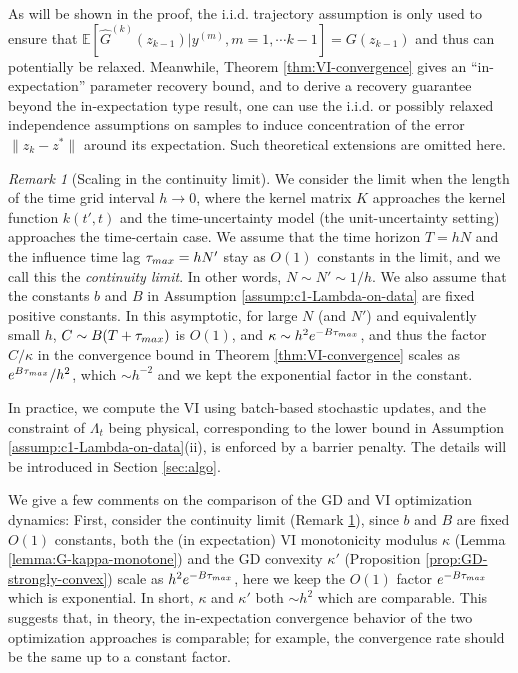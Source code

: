 \documentclass[11pt]{article}
\theoremstyle{remark}
\newtheorem{remark}{Remark}[section]
\theoremstyle{plain}
\newcommand{\E}{\mathbb{E}}
\begin{document}
As will be shown in the proof, the i.i.d. trajectory assumption is only used to ensure that  $\E [ \hat G^{(k)}(z_{k-1}) | y^{(m)}, m=1, \cdots k-1 ]  = G(z_{k-1})$ and thus can potentially be relaxed. 
Meanwhile, Theorem \ref{thm:VI-convergence} gives an ``in-expectation'' parameter recovery bound, and to derive a recovery guarantee beyond the in-expectation type result, one can use the i.i.d. or possibly relaxed independence assumptions on samples to induce concentration of the error $\| z_k - z^*\| $ around its expectation.
Such theoretical extensions are omitted here. 


\begin{remark}[Scaling in the continuity limit]\label{rk:cont-limit-scaling}
We consider the limit when the length of the time grid interval $h \to 0$,
where the kernel matrix $K$ approaches the kernel function $k(t',t)$
and the time-uncertainty model (the unit-uncertainty setting) approaches the time-certain case.
We assume that the time horizon $T = h N$ and the influence time lag $\tau_{\rm max} = h N' $ stay as $O(1)$ constants in the limit, and we call this the {\it continuity limit}. 
In other words, $N \sim N' \sim 1/h$.
We also assume that the constants $b$ and $B$ in Assumption \ref{assump:c1-Lambda-on-data} are fixed positive constants. 
%
In this asymptotic, for large $N$ (and $N'$) and equivalently small $h$, $C \sim B(T + \tau_{\rm max}) $ is $O(1)$,
and $\kappa \sim h^2 e^{-B \tau_{\rm max}}$,
and thus the factor $C/\kappa$ in the convergence bound in Theorem    \ref{thm:VI-convergence}  scales as $e^{B\tau_{\rm max}}/h^2$, which $\sim h^{-2}$ and we kept the exponential factor in the constant. 
\end{remark}


In practice, we compute the VI using batch-based stochastic updates, and the constraint of $\Lambda_t$ being physical,
corresponding to the lower bound in Assumption \ref{assump:c1-Lambda-on-data}(ii),
is enforced by a barrier penalty. The details will be introduced in Section \ref{sec:algo}. 


We give a few comments on the comparison of the GD and VI optimization dynamics:
First, consider the continuity limit (Remark \ref{rk:cont-limit-scaling}), 
since $b$ and $B$ are fixed $O(1)$ constants,
both the (in expectation)
VI monotonicity modulus $\kappa$ (Lemma \ref{lemma:G-kappa-monotone})
 and the GD convexity $\kappa'$ (Proposition \ref{prop:GD-strongly-convex})
 scale as $h^2 e^{-B \tau_{\rm max}}$, here we keep the $O(1)$ factor $e^{-B \tau_{\rm max}}$ which is exponential. 
 In short, $\kappa$ and $\kappa'$ both $\sim h^2$ which are comparable. 
 This suggests that, in theory, the in-expectation convergence behavior of the two optimization approaches is comparable; for example, the convergence rate should be the same up to a constant factor. 
\end{document}
